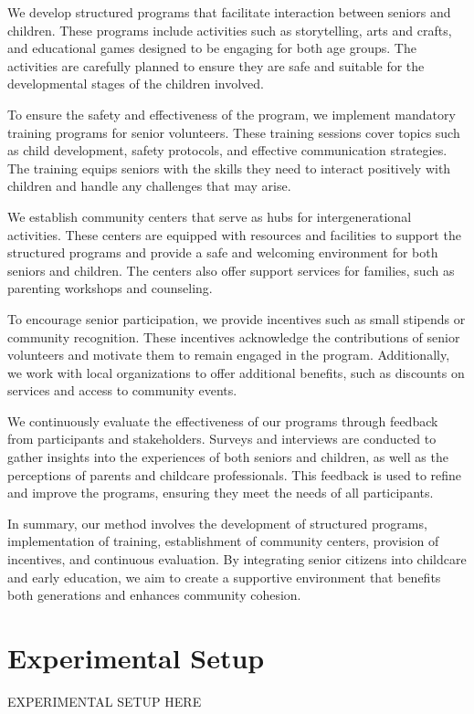 \documentclass{article} %
\begin{document}
We develop structured programs that facilitate interaction between seniors and children. These programs include activities such as storytelling, arts and crafts, and educational games designed to be engaging for both age groups. The activities are carefully planned to ensure they are safe and suitable for the developmental stages of the children involved.

To ensure the safety and effectiveness of the program, we implement mandatory training programs for senior volunteers. These training sessions cover topics such as child development, safety protocols, and effective communication strategies. The training equips seniors with the skills they need to interact positively with children and handle any challenges that may arise.

We establish community centers that serve as hubs for intergenerational activities. These centers are equipped with resources and facilities to support the structured programs and provide a safe and welcoming environment for both seniors and children. The centers also offer support services for families, such as parenting workshops and counseling.

To encourage senior participation, we provide incentives such as small stipends or community recognition. These incentives acknowledge the contributions of senior volunteers and motivate them to remain engaged in the program. Additionally, we work with local organizations to offer additional benefits, such as discounts on services and access to community events.

We continuously evaluate the effectiveness of our programs through feedback from participants and stakeholders. Surveys and interviews are conducted to gather insights into the experiences of both seniors and children, as well as the perceptions of parents and childcare professionals. This feedback is used to refine and improve the programs, ensuring they meet the needs of all participants.

In summary, our method involves the development of structured programs, implementation of training, establishment of community centers, provision of incentives, and continuous evaluation. By integrating senior citizens into childcare and early education, we aim to create a supportive environment that benefits both generations and enhances community cohesion.

\section{Experimental Setup}
\label{sec:experimental}
EXPERIMENTAL SETUP HERE
\end{document}
